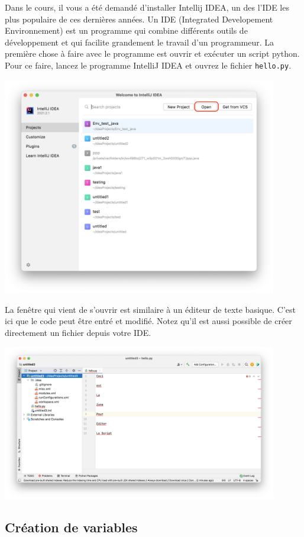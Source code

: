 Dans le cours, il vous a été demandé d'installer Intellij IDEA, un des l'IDE les plus populaire de ces dernières années. Un IDE (Integrated Developement Environnement) est un programme qui combine différents outils de développement et qui facilite grandement le travail d'un programmeur. La première chose à faire avec le programme est ouvrir et exécuter un script python. Pour ce faire, lancez le programme IntelliJ IDEA et ouvrez le fichier \lstinline{hello.py}.
\begin{center}
	\includegraphics[width=12cm]{2}	
\end{center}

La fenêtre qui vient de s'ouvrir est similaire à un éditeur de texte basique. C'est ici que le code peut être entré et modifié. Notez qu'il est aussi possible de créer directement un fichier depuis votre IDE.
\begin{center}
	\includegraphics[width=12cm]{3}	
\end{center}


\subsection{Création de variables}

